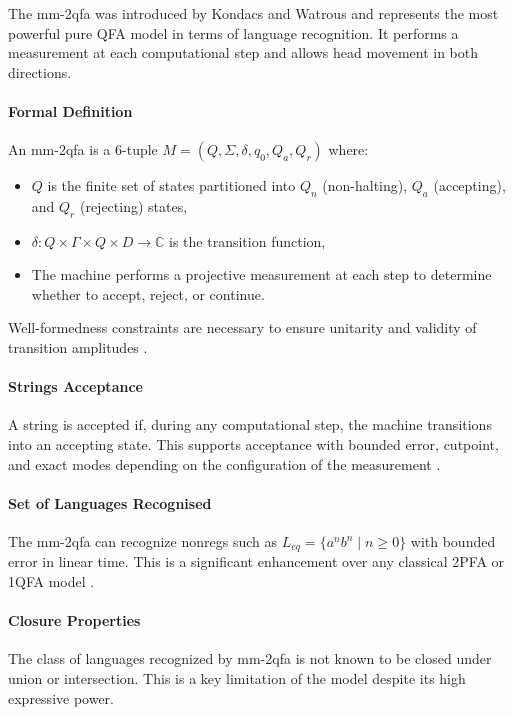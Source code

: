 \subsubsection{}

The \gls{mm-2qfa} was introduced by Kondacs and Watrous \cite{kondacs1997power} and represents the most powerful pure QFA model in terms of language recognition. It performs a measurement at each computational step and allows head movement in both directions.

\paragraph{Formal Definition} An \gls{mm-2qfa} is a 6-tuple $M = (Q, \Sigma, \delta, q_0, Q_a, Q_r)$ where:
\begin{itemize}
    \item $Q$ is the finite set of states partitioned into $Q_n$ (non-halting), $Q_a$ (accepting), and $Q_r$ (rejecting) states,
    \item $\delta: Q \times \Gamma \times Q \times D \to \mathbb{C}$ is the transition function,
    \item The machine performs a projective measurement at each step to determine whether to accept, reject, or continue.
\end{itemize}
Well-formedness constraints are necessary to ensure unitarity and validity of transition amplitudes \cite{kondacs1997power}.

\paragraph{Strings Acceptance} A string is accepted if, during any computational step, the machine transitions into an accepting state. This supports acceptance with bounded error, cutpoint, and exact modes depending on the configuration of the measurement \cite{kondacs1997power}.

\paragraph{Set of Languages Recognised} The \gls{mm-2qfa} can recognize non\glspl{reg} such as $L_{eq} = \{ a^n b^n \mid n \geq 0 \}$ with bounded error in linear time. This is a significant enhancement over any classical 2PFA or 1QFA model \cite{kondacs1997power}.

\paragraph{Closure Properties} The class of languages recognized by \gls{mm-2qfa} is not known to be closed under union or intersection. This is a key limitation of the model despite its high expressive power.

